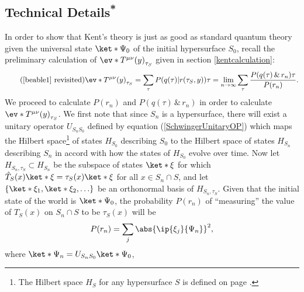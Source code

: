 \documentclass[12pt]{report}
\providecommand{\DIFaddbegin}{} %
\providecommand{\DIFaddend}{} %
\providecommand{\DIFdelbegin}{} %
\providecommand{\DIFdelend}{} %
\begin{document}
\subsection{Technical Details\textsuperscript{*}}
In order to show that Kent's theory is just as good as standard quantum theory given the universal state $\ket*{\Psi_0}$ of the initial hypersurface $S_0$,  recall the preliminary calculation of $\ev*{T^{\mu\nu}(y)}_{\tau_S}$ given in section \ref{kentcalculation}:
\begin{equation}\tag{\ref{beable1} revisited}
	\ev*{T^{\mu\nu}(y)}_{\tau_S}=\sum_\tau P(q(\tau) | r(\tau_S,y))\tau=\lim_{n\rightarrow\infty}\sum_\tau\frac{P(q(\tau) \, \& \, r_n)\tau}{P(r_n)}.
\end{equation}
We proceed to calculate $P(r_n)$ and $P(q(\tau)\, \& \,r_n)$ in order to calculate  $\ev*{T^{\mu\nu}(y)}_{\tau_S}$. We first note that since $S_n$ is a hypersurface,   there will exist a unitary operator $U_{S_nS_0}$ defined by equation (\ref{SchwingerUnitaryOP}) which maps the Hilbert space\footnote{The Hilbert space $H_S$ for any hypersurface $S$ is defined on page \pageref{HSdef}.} of states $H_{S_0}$ describing $S_0$ to the Hilbert space of states $H_{S_n}$\label{HSidef} describing $S_n$ in accord with how the states of $H_{S_0}$  evolve over time. Now let $H_{S_n,\tau_S}\label{HStau}\subset H_{S_n}$ %
%
 be the subspace of states $\ket*{\xi}$ for which  $\hat{T}_S(x)\ket*{\xi}=\tau_S(x)\ket*{\xi}$  for all $x\in S_n\cap S$, and  let $\{\ket*{\xi_1},\ket*{\xi_2},\ldots\}$  %
 \DIFdelbegin %
\DIFdelend \DIFaddbegin {}\DIFaddend %
 be an orthonormal basis of $H_{S_n,\tau_S}$. Given that the initial state of the world is $\ket*{\Psi_0}$, the probability $P(r_n)$ of ``measuring'' the value of $T_S(x)$ on $S_n\cap S$ to be $\tau_S(x)$ will be 
\begin{equation}\label{Pri}
P(r_n)=\sum_j \abs{ \ip{\xi_j}{\Psi_n}}^2,
\end{equation}
where $\ket*{\Psi_n}=U_{S_nS_0}\ket*{\Psi_0}$, %
%
\end{document}
